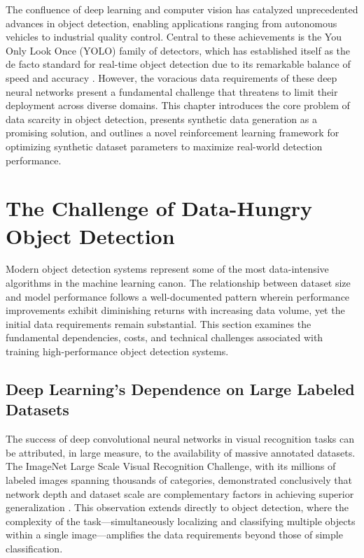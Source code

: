 

The confluence of deep learning and computer vision has catalyzed unprecedented advances in object detection, enabling applications ranging from autonomous vehicles to industrial quality control. Central to these achievements is the You Only Look Once (YOLO) family of detectors, which has established itself as the de facto standard for real-time object detection due to its remarkable balance of speed and accuracy \cite{redmon2016yolo, jocher2023yolov8}. However, the voracious data requirements of these deep neural networks present a fundamental challenge that threatens to limit their deployment across diverse domains. This chapter introduces the core problem of data scarcity in object detection, presents synthetic data generation as a promising solution, and outlines a novel reinforcement learning framework for optimizing synthetic dataset parameters to maximize real-world detection performance.

\section{The Challenge of Data-Hungry Object Detection}
\label{sec:data_hungry}

Modern object detection systems represent some of the most data-intensive algorithms in the machine learning canon. The relationship between dataset size and model performance follows a well-documented pattern wherein performance improvements exhibit diminishing returns with increasing data volume, yet the initial data requirements remain substantial. This section examines the fundamental dependencies, costs, and technical challenges associated with training high-performance object detection systems.

\subsection{Deep Learning's Dependence on Large Labeled Datasets}
\label{subsec:deep_learning_dependence}

The success of deep convolutional neural networks in visual recognition tasks can be attributed, in large measure, to the availability of massive annotated datasets. The ImageNet Large Scale Visual Recognition Challenge, with its millions of labeled images spanning thousands of categories, demonstrated conclusively that network depth and dataset scale are complementary factors in achieving superior generalization \cite{krizhevsky2012imagenet}. This observation extends directly to object detection, where the complexity of the task---simultaneously localizing and classifying multiple objects within a single image---amplifies the data requirements beyond those of simple classification.

